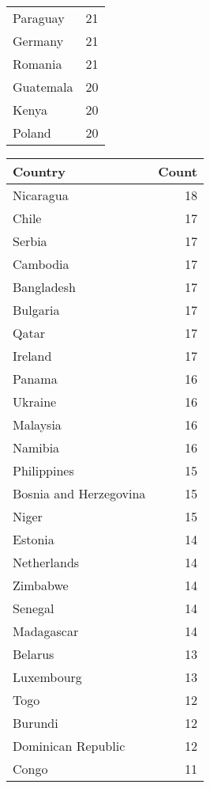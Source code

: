 {\begin{table}[ht!]
\begin{minipage}[t]{0.50\textwidth}
\begin{tabular}{lr}
            Paraguay & 21 \\
            Germany & 21 \\
            Romania & 21 \\
            Guatemala & 20 \\
            Kenya & 20 \\
            Poland & 20 \\
            \bottomrule
        \end{tabular}
    \end{minipage}
    \hspace{-2.5cm}
    \begin{minipage}[t]{0.50\textwidth}
        \scriptsize
        \centering
        \begin{tabular}{lr}
        \toprule
        Country & Count \\
        \midrule
        Nicaragua & 18 \\
        Chile & 17 \\
        Serbia & 17 \\
        Cambodia & 17 \\
        Bangladesh & 17 \\
        Bulgaria & 17 \\
        Qatar & 17 \\
        Ireland & 17 \\
        Panama & 16 \\
        Ukraine & 16 \\
        Malaysia & 16 \\
        Namibia & 16 \\
        Philippines & 15 \\
        Bosnia and Herzegovina & 15 \\
        Niger & 15 \\
        Estonia & 14 \\
        Netherlands & 14 \\
        Zimbabwe & 14 \\
        Senegal & 14 \\
        Madagascar & 14 \\
        Belarus & 13 \\
        Luxembourg & 13 \\
        Togo & 12 \\
        Burundi & 12 \\
        Dominican Republic & 12 \\
        Congo & 11 \\

\end{tabular}
\end{minipage}
\end{table}}
